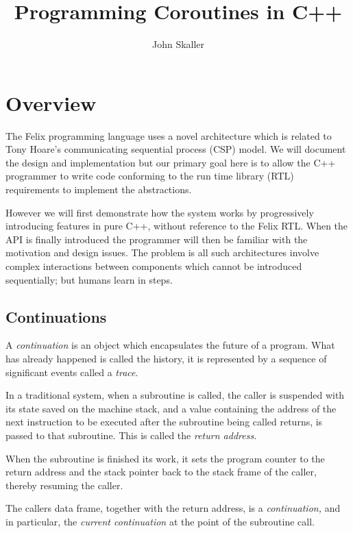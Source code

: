 \documentclass[oneside]{book}
\title{Programming Coroutines in C++}
\author{John Skaller}
\begin{document}
\maketitle
\tableofcontents
\chapter{Overview}
The Felix programming language uses a novel architecture which is related to
Tony Hoare's communicating sequential process (CSP) model. We will document
the design and implementation but our primary goal here is to allow the
C++ programmer to write code conforming to the run time library (RTL) requirements
to implement the abstractions.

However we will first demonstrate how the system works by progressively
introducing features in pure C++, without reference to the Felix RTL.
When the API is finally introduced the programmer will then be familiar
with the motivation and design issues. The problem is all such architectures
involve complex interactions between components which cannot be introduced
sequentially; but humans learn in steps.


\section{Continuations}
A {\em continuation} is an object which encapsulates the future of a program.
What has already happened is called the history, it is represented by a sequence
of significant events called a {\em trace}.

In a traditional system, when a subroutine is called, the caller is suspended
with its state saved on the machine stack, and a value containing the address
of the next instruction to be executed after the subroutine being called
returns, is passed to that subroutine. This is called the {\em return address.}

When the subroutine is finished its work, it sets the program counter
to the return address and the stack pointer back to the stack frame of the
caller, thereby resuming the caller.

The callers data frame, together with the return address, is a {\em continuation,}
and in particular, the {\em current continuation} at the point of the subroutine 
call.
\end{document}

